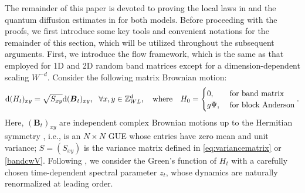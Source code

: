 The remainder of this paper is devoted to proving the local laws in  and the quantum diffusion estimates in  for both models. Before proceeding with the proofs, we first introduce some key tools and convenient notations for the remainder of this section, which will be utilized throughout the subsequent arguments. 
First, we introduce the flow framework, which is the same as that employed for 1D and 2D random band matrices \cite{YY_25,DYYY25} except for a dimension-dependent scaling $W^{-d}$. Consider the following matrix Brownian motion: 
\begin{align}\label{MBM}
	\dd (H_{t})_{xy}=\sqrt{S_{xy}}\dd (\boldsymbol{B}_{t})_{xy}, \ \ \forall x,y\in \ZL,\quad \text{where}\quad  H_{0}=\begin{cases}
	    0, \ &\text{for band matrix}\\
        \ilambda\Psi, \ &\text{for block Anderson}
	\end{cases}.
\end{align}
Here, $(\boldsymbol{B}_{t})_{xy}$ are independent complex Brownian motions up to the Hermitian symmetry , i.e.,  is an $N\times N$ GUE whose entries have zero mean and unit variance; $S=(S_{xy})$ is the variance matrix defined in \eqref{eq:variancematrix} or \eqref{bandcwV}. %
Following \cite{10.1214/19-ECP278, Sooster2019, DY}, we consider the Green's function of \( H_t \) with a carefully chosen time-dependent spectral parameter \( z_t \), whose dynamics are naturally renormalized at leading order.

 


